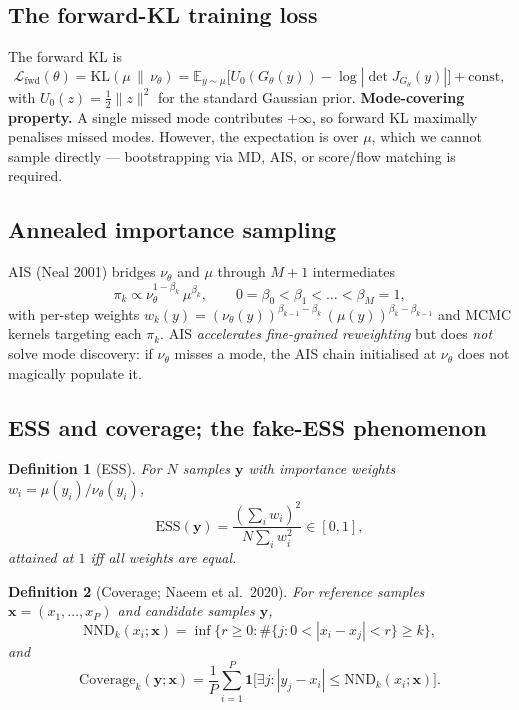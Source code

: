 \documentclass[11pt,letterpaper]{article}
\newcommand{\E}{\mathbb{E}}
\newcommand{\KLdiv}{\mathrm{KL}}
\newcommand{\ESS}{\mathrm{ESS}}
\newcommand{\Cov}{\mathrm{Coverage}}
\newcommand{\NND}{\mathrm{NND}}
\newcommand{\Le}{\leqslant}
\newcommand{\Ge}{\geqslant}
\theoremstyle{plain}
\newtheorem{definition}{Definition}
\begin{document}
\subsection{The forward-KL training loss}

The forward KL is
\[
  \mathcal L_{\mathrm{fwd}}(\theta) = \KLdiv(\mu\,\|\,\nu_\theta) = \E_{y\sim\mu}\!\big[U_0(G_\theta(y)) - \log|\det J_{G_\theta}(y)|\big] + \mathrm{const},
\]
with $U_0(z)=\tfrac{1}{2}\|z\|^2$ for the standard Gaussian prior.
\textbf{Mode-covering property.} A single missed mode contributes $+\infty$, so
forward KL maximally penalises missed modes. However, the expectation is over
$\mu$, which we cannot sample directly --- bootstrapping via MD, AIS, or
score/flow matching is required.

\subsection{Annealed importance sampling}

AIS (Neal 2001) bridges $\nu_\theta$ and $\mu$ through $M+1$ intermediates
\[
  \pi_k \propto \nu_\theta^{1-\beta_k}\,\mu^{\beta_k},\qquad 0=\beta_0<\beta_1<\dots<\beta_M=1,
\]
with per-step weights $w_k(y) = (\nu_\theta(y))^{\beta_{k-1}-\beta_k}\,(\mu(y))^{\beta_k-\beta_{k-1}}$ and
MCMC kernels targeting each $\pi_k$. AIS \emph{accelerates fine-grained reweighting}
but does \emph{not} solve mode discovery: if $\nu_\theta$ misses a mode, the AIS chain
initialised at $\nu_\theta$ does not magically populate it.

\subsection{ESS and coverage; the fake-ESS phenomenon}

\begin{definition}[ESS]
For $N$ samples $\mathbf y$ with importance weights $w_i=\mu(y_i)/\nu_\theta(y_i)$,
\[
  \ESS(\mathbf y) = \frac{(\sum_i w_i)^2}{N\sum_i w_i^2}\in[0,1],
\]
attained at $1$ iff all weights are equal.
\end{definition}

\begin{definition}[Coverage; Naeem et al.~2020]
For reference samples $\mathbf x=(x_1,\dots,x_P)$ and candidate samples
$\mathbf y$,
\[
  \NND_k(x_i;\mathbf x) = \inf\{r\Ge 0:\#\{j:0<|x_i-x_j|<r\}\Ge k\},
\]
and
\[
  \Cov_k(\mathbf y;\mathbf x) = \frac{1}{P}\sum_{i=1}^P \mathbf 1\!\big[\exists j: |y_j-x_i|\Le\NND_k(x_i;\mathbf x)\big].
\]
\end{definition}
\end{document}
